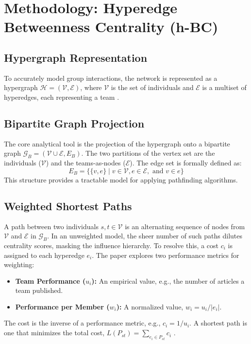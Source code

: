\documentclass[11pt, a4paper]{article}
\begin{document}
{\section{Methodology: Hyperedge Betweenness Centrality (h-BC)}

\subsection{Hypergraph Representation}
To accurately model group interactions, the network is represented as a hypergraph $\mathcal{H} = (\mathcal{V}, \mathcal{E})$, where $\mathcal{V}$ is the set of individuals and $\mathcal{E}$ is a multiset of hyperedges, each representing a team \cite{1362}.

\subsection{Bipartite Graph Projection}
The core analytical tool is the projection of the hypergraph onto a bipartite graph $\mathcal{G}_B = (\mathcal{V} \cup \mathcal{E}, E_B)$. The two partitions of the vertex set are the individuals ($\mathcal{V}$) and the teams-as-nodes ($\mathcal{E}$). The edge set is formally defined as:
\begin{equation}
    E_B = \{ \{v, e\} \mid v \in \mathcal{V}, e \in \mathcal{E}, \text{ and } v \in e \}
\end{equation}
This structure provides a tractable model for applying pathfinding algorithms.

\subsection{Weighted Shortest Paths}
A path between two individuals $s,t \in \mathcal{V}$ is an alternating sequence of nodes from $\mathcal{V}$ and $\mathcal{E}$ in $\mathcal{G}_B$. In an unweighted model, the sheer number of such paths dilutes centrality scores, masking the influence hierarchy. To resolve this, a cost $c_i$ is assigned to each hyperedge $e_i$. The paper explores two performance metrics for weighting:
\begin{itemize}
    \item \textbf{Team Performance ($u_i$):} An empirical value, e.g., the number of articles a team published.
    \item \textbf{Performance per Member ($w_i$):} A normalized value, $w_i = u_i / |e_i|$.
\end{itemize}
The cost is the inverse of a performance metric, e.g., $c_i = 1/u_i$. A shortest path is one that minimizes the total cost, $L(P_{st}) = \sum_{e_i \in P_{st}} c_i$ \cite{1785}.

}
\end{document}
